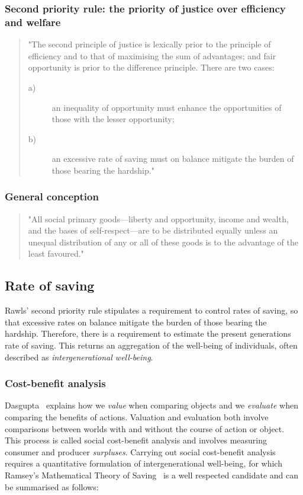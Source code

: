 \documentclass[11pt, oneside]{article}   	%
\begin{document}
\subsubsection{Second priority rule: the priority of justice over efficiency and welfare}

\begin{quote}
"The second principle of justice is lexically prior to the principle of efficiency and to that of maximising the sum of advantages; and fair opportunity is prior to the difference principle. There are two cases:
\begin{description}
\item[ a)] an inequality of opportunity must enhance the opportunities of those with the lesser opportunity;
\item[ b)] an excessive rate of saving must on balance mitigate the burden of those bearing the hardship."
\end{description}
\end{quote}

\subsubsection{General conception}

\begin{quote}
"All social primary goods---liberty and opportunity, income and wealth, and the bases of self-respect---are to be distributed equally unless an unequal distribution of any or all of these goods is to the advantage of the least favoured."
\end{quote}

\subsection{Rate of saving}

Rawls' second priority rule stipulates a requirement to control rates of saving, so that excessive rates on balance mitigate the burden of those bearing the hardship. Therefore, there is a requirement to estimate the present generations rate of saving. This returns an aggregation of the well-being of individuals, often described as \emph{intergenerational well-being}.

\subsubsection{Cost-benefit analysis}

Dasgupta~\cite{pd2} explains how we \emph{value} when comparing objects and we \emph{evaluate} when comparing the benefits of actions. Valuation and evaluation both involve comparisons between worlds with and without the course of action or object. This process is called social cost-benefit analysis and involves measuring consumer and producer \emph{surpluses}. Carrying out social cost-benefit analysis requires a quantitative formulation of intergenerational well-being, for which Ramsey's Mathematical Theory of Saving~\cite{fr1} is a well respected candidate and can be summarised as follows:
\end{document}

